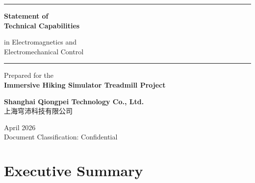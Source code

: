 \documentclass[a4paper,11pt]{article}
\begin{document}
\thispagestyle{empty}
\begin{center}

\vspace*{4cm}

{\color{brandblue}\rule{\textwidth}{1.5pt}}

\vspace{1.5cm}

{\Huge\bfseries\color{brandblue} Statement of\\[0.4em] Technical Capabilities}

\vspace{0.8cm}

{\Large\color{darkgray} in Electromagnetics and\\[0.3em] Electromechanical Control}

\vspace{1.5cm}

{\color{brandblue}\rule{\textwidth}{1.5pt}}

\vspace{2cm}

{\large Prepared for the\\[0.3em]
\textbf{Immersive Hiking Simulator Treadmill Project}}

\vspace{3cm}

{\Large\bfseries Shanghai Qiongpei Technology Co., Ltd.}\\[0.5em]
{\large 上海穹沛科技有限公司}

\vspace{1cm}

{\large April 2026}\\[0.5em]
{\color{darkgray} Document Classification: Confidential}

\end{center}

\newpage

\tableofcontents
\newpage

\section{Executive Summary}
\end{document}

